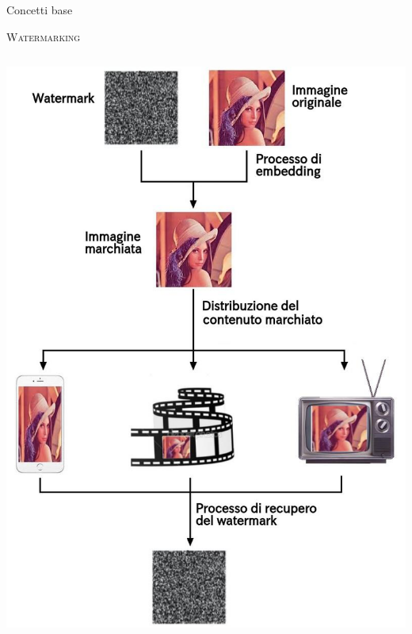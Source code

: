 \documentclass{beamer}
\begin{document}
\begin{section}{Concetti base}
\begin{frame}[t]{\textsc{Watermarking}}
\begin{columns}
\begin{column}{5cm}
\includegraphics[width=1\linewidth]{./img/wat_workflow.jpg}
\end{column}
\end{columns}
\end{frame}


\end{section}
\end{document}
